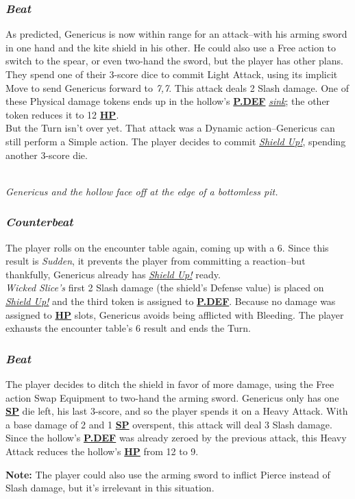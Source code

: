 \documentclass[12pt]{article}
\newcommand{\refto}[1]{\hyperlink{#1}{\textbf{#1}}}
\newcommand{\reftoit}[1]{\hyperlink{#1}{\emph{#1}}}
\begin{document}
\begin{multicols*}{2}
\subsubsection*{\emph{Beat}}
As predicted, Genericus is now within range for an attack--with his arming sword in one hand and the kite shield in his other. He could also use a Free action to switch to the spear, or even two-hand the sword, but the player has other plans.\\
They spend one of their 3-score dice to commit Light Attack, using its implicit Move to send Genericus forward to \emph{7,7}. This attack deals 2 Slash damage. One of these Physical damage tokens ends up in the hollow’s \refto{P.DEF} \reftoit{sink}; the other token reduces it to 12 \refto{HP}.\\
But the Turn isn’t over yet. That attack was a Dynamic action--Genericus can still perform a Simple action. The player decides to commit \reftoit{Shield Up!}, spending another 3-score die.
\begin{center}
\\
\emph{Genericus and the hollow face off at the edge of a bottomless pit.}
\end{center}
\subsubsection*{\emph{Counterbeat}}
The player rolls on the encounter table again, coming up with a 6. Since this result is \emph{Sudden}, it prevents the player from committing a reaction--but thankfully, Genericus already has \reftoit{Shield Up!} ready.\\
\emph{Wicked Slice’s} first 2 Slash damage (the shield’s Defense value) is placed on \reftoit{Shield Up!} and the third token is assigned to \refto{P.DEF}. Because no damage was assigned to \refto{HP} slots, Genericus avoids being afflicted with Bleeding. The player exhausts the encounter table’s 6 result and ends the Turn.
\subsubsection*{\emph{Beat}}
The player decides to ditch the shield in favor of more damage, using the Free action Swap Equipment to two-hand the arming sword. Genericus only has one \refto{SP} die left, his last 3-score, and so the player spends it on a Heavy Attack. With a base damage of 2 and 1 \refto{SP} overspent, this attack will deal 3 Slash damage.\\
Since the hollow’s \refto{P.DEF} was already zeroed by the previous attack, this Heavy Attack reduces the hollow’s \refto{HP} from 12 to 9.
\begin{tcolorbox}
\textbf{Note:} The player could also use the arming sword to inflict Pierce instead of Slash damage, but it’s irrelevant in this situation.
\end{tcolorbox}

\end{multicols*}
\end{document}
